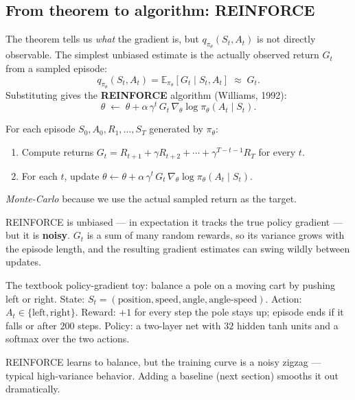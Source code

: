 \documentclass[11pt, oneside]{book}
\newcommand{\E}{\mathbb{E}}              %
\begin{document}
\subsection{From theorem to algorithm: REINFORCE}

The theorem tells us \emph{what} the gradient is, but $q_{\pi_\theta}(S_t, A_t)$ is
not directly observable.
The simplest unbiased estimate is the actually observed return $G_t$ from a sampled
episode:
\[
  q_{\pi_\theta}(S_t, A_t) = \E_{\pi_\theta}[G_t \mid S_t, A_t] \;\approx\; G_t.
\]
Substituting gives the \textbf{REINFORCE} algorithm (Williams, 1992):
\[
  \theta \;\leftarrow\; \theta + \alpha\, \gamma^t\, G_t\, \nabla_\theta \log \pi_\theta(A_t \mid S_t).
\]

\begin{thmbox}[title={REINFORCE (Monte-Carlo Policy Gradient)}]
For each episode $S_0, A_0, R_1, \dots, S_T$ generated by $\pi_\theta$:
\begin{enumerate}
  \item Compute returns $G_t = R_{t+1} + \gamma R_{t+2} + \cdots + \gamma^{T-t-1} R_T$
    for every $t$.
  \item For each $t$, update
  $\theta \leftarrow \theta + \alpha\, \gamma^t\, G_t\, \nabla_\theta \log \pi_\theta(A_t \mid S_t).$
\end{enumerate}
\emph{Monte-Carlo} because we use the actual sampled return as the target.
\end{thmbox}

REINFORCE is unbiased --- in expectation it tracks the true policy gradient ---
but it is \textbf{noisy}.
$G_t$ is a sum of many random rewards, so its variance grows with the episode length,
and the resulting gradient estimates can swing wildly between updates.

\begin{exbox}[title={CartPole as a sanity check}]
The textbook policy-gradient toy: balance a pole on a moving cart by pushing left or
right. State: $S_t = (\text{position}, \text{speed}, \text{angle}, \text{angle-speed})$.
Action: $A_t \in \{\text{left}, \text{right}\}$. Reward: $+1$ for every step the pole
stays up; episode ends if it falls or after $200$ steps.
Policy: a two-layer net with $32$ hidden tanh units and a softmax over the two actions.

REINFORCE learns to balance, but the training curve is a noisy zigzag --- typical
high-variance behavior. Adding a baseline (next section) smooths it out dramatically.
\end{exbox}
\end{document}
